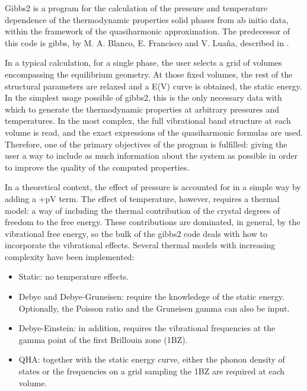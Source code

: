 \documentclass[a4paper]{article}
\begin{document}
Gibbs2 is a program for the calculation of the pressure and
temperature dependence of the thermodynamic properties solid phases
from ab initio data, within the framework of the quasiharmonic
approximation. The predecessor of this code is gibbs, by M. A. Blanco,
E. Francisco and V. Luaña, described in \cite{orig}.

In a typical calculation, for a single phase, the user
selects a grid of volumes encompassing the equilibrium geometry. At
those fixed volumes, the rest of the structural parameters are relaxed
and a E(V) curve is obtained, the static energy. In the simplest usage
possible of gibbs2, this is the only necessary data with which to
generate the thermodynamic properties at arbitrary pressures and
temperatures. In the most complex, the full vibrational band structure
at each volume is read, and the exact expressions of the quasiharmonic
formulas are used. Therefore, one of the primary objectives of the
program is fulfilled: giving the user a way to include as much
information about the system as possible in order to improve the
quality of the computed properties.

In a theoretical context, the effect of pressure is accounted for in a
simple way by adding a +pV term. The effect of temperature, however,
requires a thermal model: a way of including the thermal contribution
of the crystal degrees of freedom to the free energy. These
contributions are dominated, in general, by the vibrational free
energy, so the bulk of the gibbs2 code deals with how to incorporate
the vibrational effects. Several thermal models with increasing
complexity have been implemented:

\begin{itemize}
\item Static: no temperature effects.

\item Debye and Debye-Gruneisen: require the knowledege of the static
energy. Optionally, the Poisson ratio and the Gruneisen gamma can
also be input.

\item Debye-Einstein: in addition, requires the vibrational frequencies at
the gamma point of the first Brillouin zone (1BZ).

\item QHA: together with the static energy curve, either the phonon
density of states or the frequencies on a grid sampling the 1BZ are
required at each volume.
\end{itemize}
\end{document}

